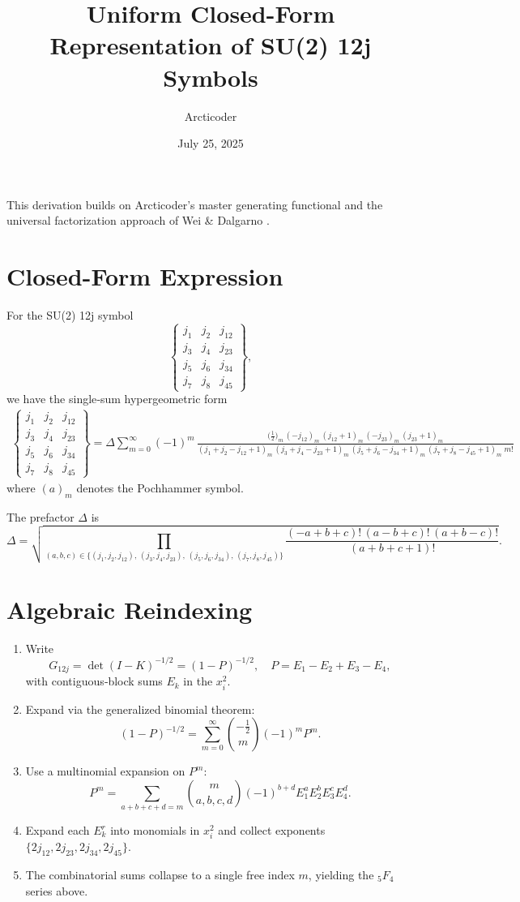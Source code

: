 \documentclass{article}
\title{Uniform Closed-Form Representation of SU(2) 12j Symbols}
\author{Arcticoder}
\date{July 25, 2025}
\begin{document}
\maketitle

This derivation builds on 
Arcticoder’s master generating functional \cite{Arcticoder2025}
and the universal factorization approach of Wei \& Dalgarno \cite{WeiDalgarno2003}.

\section*{Closed-Form Expression}

For the SU(2) 12j symbol
\[
\begin{Bmatrix}
j_1 & j_2 & j_{12}\\
j_3 & j_4 & j_{23}\\
j_5 & j_6 & j_{34}\\
j_7 & j_8 & j_{45}
\end{Bmatrix},
\]
we have the single‐sum hypergeometric form
\[
\boxed{
\begin{aligned}
\begin{Bmatrix}
j_1 & j_2 & j_{12}\\
j_3 & j_4 & j_{23}\\
j_5 & j_6 & j_{34}\\
j_7 & j_8 & j_{45}
\end{Bmatrix}
= \Delta
\sum_{m=0}^{\infty} (-1)^m \,
\frac{\bigl(\tfrac12\bigr)_m\,(-j_{12})_m\,(j_{12}+1)_m\,(-j_{23})_m\,(j_{23}+1)_m}
{(j_1+j_2 - j_{12} +1)_m\,(j_3+j_4 - j_{23} +1)_m\,(j_5+j_6 - j_{34} +1)_m\,(j_7+j_8 - j_{45} +1)_m \; m!}
\end{aligned}
}
\]
where \((a)_m\) denotes the Pochhammer symbol.

The prefactor \(\Delta\) is
\[
\Delta = \sqrt{
\prod_{(a,b,c)\in
\{(j_1,j_2,j_{12}),\,(j_3,j_4,j_{23}),\,(j_5,j_6,j_{34}),\,(j_7,j_8,j_{45})\}}
\frac{(-a+b+c)!\,(a-b+c)!\,(a+b-c)!}{(a+b+c+1)!}
}.
\]

\section*{Algebraic Reindexing}

\begin{enumerate}
  \item Write 
  \[
    G_{12j} = \det(I-K)^{-1/2}
    = (1 - P)^{-1/2},\quad
    P = E_1 - E_2 + E_3 - E_4,
  \]
  with contiguous‐block sums \(E_k\) in the \(x_i^2\).
  \item Expand via the generalized binomial theorem:
  \[
    (1-P)^{-1/2}
    = \sum_{m=0}^\infty \binom{-\tfrac12}{m}(-1)^m P^m.
  \]
  \item Use a multinomial expansion on \(P^m\):
  \[
    P^m = \sum_{a+b+c+d=m}
    \binom{m}{a,b,c,d}(-1)^{b+d}
    E_1^a E_2^b E_3^c E_4^d.
  \]
  \item Expand each \(E_k^r\) into monomials in \(x_i^{2}\) and collect exponents \(\{2j_{12},2j_{23},2j_{34},2j_{45}\}\).
  \item The combinatorial sums collapse to a single free index \(m\), yielding the \({}_5F_4\) series above.
\end{enumerate}
\end{document}
